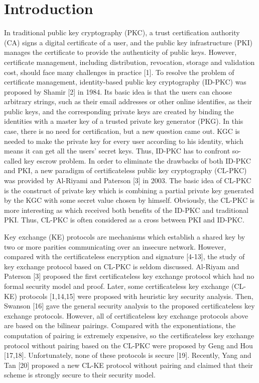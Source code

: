 \documentclass[final,1p,times,twocolumn]{elsarticle}
\begin{document}
\section{Introduction}
\label{1}


In traditional public key cryptography (PKC), a trust certification authority (CA) signs a digital certificate of a user, and the public key infrastructure (PKI) manages the certificate to provide the authenticity of public keys. However, certificate management, including distribution, revocation, storage and validation cost, should face many challenges in practice [1]. To resolve the problem of certificate management, identity-based public key cryptography (ID-PKC) was proposed by Shamir [2] in 1984. Its basic idea is that the users can choose arbitrary strings, such as their email addresses or other
online identifies, as their public keys, and the corresponding private keys are created by binding the identities with a master key
of a trusted private key generator (PKG). In this case, there is no need for certification, but a new question came out. KGC is needed to make the private key for every user according to his identity, which means it can get all the users' secret keys. Thus, ID-PKC has to confront so-called key escrow problem. In order to eliminate the drawbacks of both ID-PKC and PKI, a new paradigm of certificateless public key cryptography (CL-PKC) was provided by Al-Riyami and Paterson [3] in 2003. The basic idea of CL-PKC is the construct of private key which is combining a partial private key generated by the KGC with some secret value chosen by himself. Obviously, the CL-PKC is more interesting as which received both benefits of the ID-PKC and traditional PKI. Thus, CL-PKC is often considered as a cross between PKI and ID-PKC.

\vspace{0.1cm}

 Key exchange (KE) protocols are mechanisms which establish a shared key by two or more parities communicating over an insecure network. However, compared with the certificateless encryption and signature [4-13], the study of key exchange protocol based on CL-PKC is seldom discussed. Al-Riyam and Paterson [3] proposed the first certificateless key exchange protocol which had no formal security model and proof. Later, some certificateless key exchange (CL-KE) protocols [1,14,15] were proposed with heuristic key security analysis. Then, Swanson [16] gave the general security analysis to the proposed certificateless key exchange protocols. However, all of certificateless key exchange protocols above are based on the bilinear pairings. Compared with the exponentiations, the computation of pairing is extremely expensive, so the certificateless key exchange protocol without pairing based on the CL-PKC were proposed by Geng and Hou [17,18]. Unfortunately, none of these protocols is secure [19]. Recently, Yang and Tan [20] proposed a new CL-KE protocol without pairing and claimed that their scheme is strongly secure to their security model.
\end{document}
